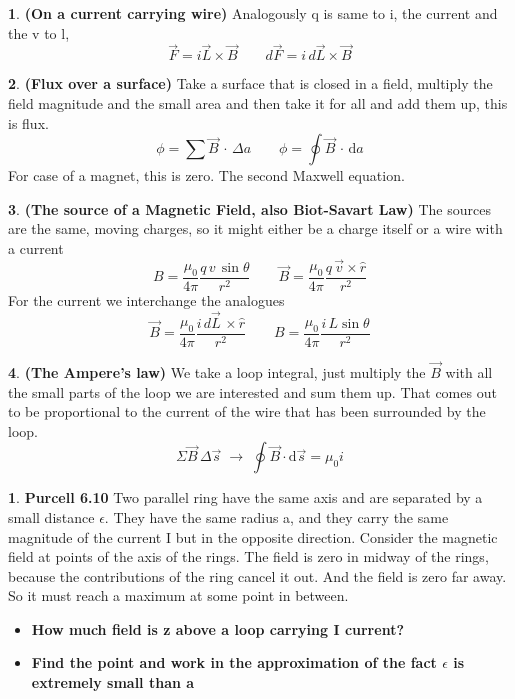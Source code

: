 \documentclass[10pt,letterpaper,twocolumn]{article}
\theoremstyle{definition}
\newtheorem{fct}{\framebox[0.07\textwidth]{{\sffamily Fact}}}[section]
\theoremstyle{definition}
\newtheorem{pr}{\framebox[0.07\textwidth]{Pr}}[section]
\theoremstyle{definition}
\begin{document}
\begin{fct}\textbf{(On a current carrying wire)}
Analogously q is same to i, the current and the v to l, 
\[\vec{F} = i \vec{L} \times \vec{B} \qquad d\vec{F} = i \, d\vec{L} \times \vec{B} \]
\end{fct}

\begin{fct}\textbf{(Flux over a surface)}
Take a surface that is closed in a field, multiply the field magnitude and the small area and then take it for all and add them up, this is flux.
\[\phi = \sum \vec{B} \, \cdot \, \Delta a \qquad \phi = \oint \vec{B} \, \cdot \, \mathrm{d}a \]
For case of a magnet, this is zero. The second Maxwell equation.
\end{fct}

\begin{fct}\textbf{(The source of a Magnetic Field, also Biot-Savart Law)}
The sources are the same, moving charges, so it might either be a charge itself or a wire with a current
\[B = \frac{\mu_0}{4 \pi} \frac{q \, v \, \sin\theta}{r^2} \qquad \vec{B} =   \frac{\mu_0}{4 \pi} \frac{q \, \vec{v} \times \hat{r}}{r^2}\]
For the current we interchange the analogues
\[ \vec{B} =  \frac{\mu_0}{4 \pi} \frac{i \, d\vec{L} \, \times \hat{r}}{r^2} \qquad B =  \frac{\mu_0}{4 \pi} \frac{i \, L \sin\theta}{r^2}\]
\end{fct}
\begin{fct}\textbf{(The Ampere's law)}
We take a loop integral, just multiply the $\vec{B}$ with all the small parts of the loop we are interested and sum them up. That comes out to be proportional to the current of the wire that has been surrounded by the loop.
\[\Sigma \vec{B} \, \Delta \vec{s} \;\rightarrow \; \oint \vec{B} \cdot \mathrm{d}\vec{s} = \mu_0 i \]
\end{fct}
\begin{pr}\textbf{Purcell 6.10}
Two parallel ring have the same axis and are separated by a small distance $\epsilon$. They have the same radius a, and they carry the same magnitude of the current I but in the opposite direction. Consider the magnetic field at points of the axis of the rings. The field is zero in midway of the rings, because the contributions of the ring cancel it out. And the field is zero far away. So it must reach a maximum at some point in between.

\begin{itemize}
\item \textbf{How much field is z above a loop carrying I current?}
\item \textbf{Find the point and work in the approximation of the fact $\epsilon$ is extremely small than a}
\end{itemize}
 

\end{pr}
\end{document}
